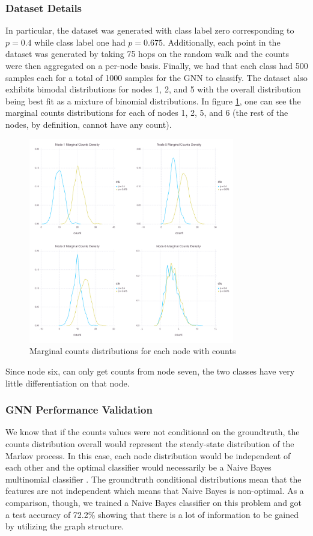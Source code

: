 \subsubsection{Dataset Details}
In particular, the dataset was generated with class label zero corresponding to $p = 0.4$ while class label one had $p = 0.675$. Additionally, each point in the dataset was generated by taking 75 hops on the random walk and the counts were then aggregated on a per-node basis. Finally, we had that each class had 500 samples each for a total of 1000 samples for the GNN to classify. The dataset also exhibits bimodal distributions for nodes 1, 2, and 5 with the overall distribution being best fit as a mixture of binomial distributions. In figure \ref{fig:tree-model-marginal-counts}, one can see the marginal counts distributions for each of nodes 1, 2, 5, and 6 (the rest of the nodes, by definition, cannot have any count). 
\begin{figure}[h]
	\centering
	\includegraphics[width=0.8\textwidth]{images/tree-model-counts.pdf}
	\caption{Marginal counts distributions for each node with counts}
	\label{fig:tree-model-marginal-counts}
\end{figure}
Since node six, can only get counts from node seven, the two classes have very little differentiation on that node.

\subsubsection{GNN Performance Validation}
We know that if the counts values were not conditional on the groundtruth, the counts distribution overall would represent the steady-state distribution of the Markov process. In this case, each node distribution would be independent of each other and the optimal classifier would necessarily be a Naive Bayes multinomial classifier \cite{zhang_exploring_2005}. The groundtruth conditional distributions mean that the features are not independent which means that Naive Bayes is non-optimal. As a comparison, though, we trained a Naive Bayes classifier on this problem and got a test accuracy of 72.2\% showing that there is a lot of information to be gained by utilizing the graph structure.  


